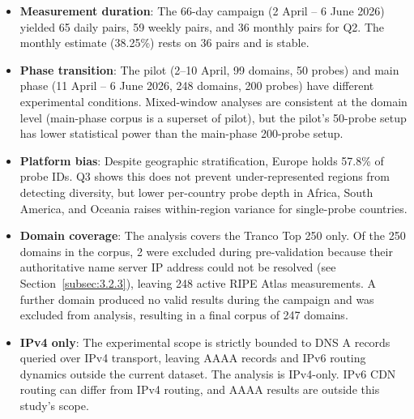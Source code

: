 \begin{itemize}
  \item \textbf{Measurement duration}: The 66-day campaign (2 April -- 6 June 2026) yielded 65 daily pairs, 59 weekly pairs, and 36 monthly pairs for Q2. The monthly estimate (38.25\%) rests on 36 pairs and is stable.
  \item \textbf{Phase transition}: The pilot (2--10 April, 99 domains, 50 probes) and main phase (11 April -- 6 June 2026, 248 domains, 200 probes) have different experimental conditions. Mixed-window analyses are consistent at the domain level (main-phase corpus is a superset of pilot), but the pilot's 50-probe setup has lower statistical power than the main-phase 200-probe setup.
  \item \textbf{Platform bias}: Despite geographic stratification, Europe holds 57.8\% of probe IDs. Q3 shows this does not prevent under-represented regions from detecting diversity, but lower per-country probe depth in Africa, South America, and Oceania raises within-region variance for single-probe countries.
  \item \textbf{Domain coverage}: The analysis covers the Tranco Top 250 only. Of the 250 domains in the corpus, 2 were excluded during pre-validation because their authoritative name server \ac{IP} address could not be resolved (see Section~\ref{subsec:3.2.3}), leaving 248 active RIPE Atlas measurements. A further domain produced no valid results during the campaign and was excluded from analysis, resulting in a final corpus of 247 domains.
  \item \textbf{\ac{IPv4} only}: The experimental scope is strictly bounded to \ac{DNS} \ac{A} records queried over \ac{IPv4} transport, leaving \ac{AAAA} records and \ac{IPv6} routing dynamics outside the current dataset. The analysis is \ac{IPv4}-only. \ac{IPv6} \ac{CDN} routing can differ from \ac{IPv4} routing, and \ac{AAAA} results are outside this study's scope.
\end{itemize}
